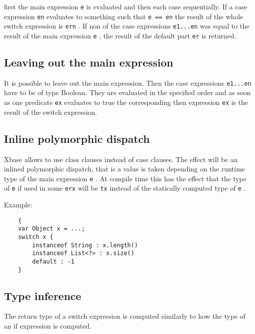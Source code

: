\documentclass[a4paper,10pt]{scrreprt}
\begin{document}
first the main expression \lstinline{e}
 is evaluated and then each case sequentially. 
If a case expression \lstinline{en}
 evaluates to something such that \lstinline{e == en}
 the result of the whole switch expression is \lstinline{ern}
. If non of the 
case expressions \lstinline{e1...en}
 was equal to the result of the main expression \lstinline{e}
, the result of the default part \lstinline{er}
 is returned.




\subsection{Leaving out the main expression}
It is possible to leave out the main expression. Then the case expressions \lstinline{e1...en}
 have to be of type Boolean. They are evaluated 
in the specified order and as soon as one predicate \lstinline{ex}
 evaluates to true the corresponding then expression \lstinline{ex}
 is the result of the switch expression.




\subsection{Inline polymorphic dispatch}
Xbase allows to use class clauses instead of case clauses. The effect will be an inlined polymorphic dispatch, that is a value is taken depending on the runtime type of the main 
expression  \lstinline{e}
. At compile time this has the effect that the type of \lstinline{e}
 if used in some \lstinline{erx}
 will be \lstinline{tx}
 instead of the statically computed type of \lstinline{e}
. 

Example:
\begin{lstlisting}
	{
	var Object x = ...;
	switch x {
		instanceof String : x.length()
		instanceof List<?> : x.size()
		default : -1
	}

\end{lstlisting}





\subsection{Type inference}
The return type of a switch expression is computed similarly to how the type of an if expression is computed. 
\end{document}
